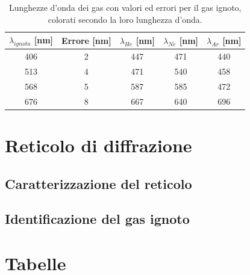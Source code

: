 \documentclass[letterpaper,12pt]{article}
\begin{document}
\begin{table}[h!]
    \centering
    \begin{tabular}{|c|c|c|c|c|}
    \hline
    \textbf{$\lambda_{ignota}$} [nm] & \textbf{Errore} [nm] & \textbf{$\lambda_{He}$} [nm] & \textbf{$\lambda_{Ne}$} [nm] & \textbf{$\lambda_{Ar}$} [nm]\\
    \hline
    \cellcolor{wavelength_406} 406 & 2 & \cellcolor{wavelength_447} 447 & \cellcolor{wavelength_471} 471 & \cellcolor{wavelength_440} 440 \\
    \hline
    \cellcolor{wavelength_513} 513 & 4 & \cellcolor{wavelength_471} 471 & \cellcolor{wavelength_540} 540 & \cellcolor{wavelength_458} 458 \\
    \hline
    \cellcolor{wavelength_568} 568 & 5 & \cellcolor{wavelength_587} 587 & \cellcolor{wavelength_585} 585 & \cellcolor{wavelength_472} 472 \\
    \hline
    \cellcolor{wavelength_676} 676 & 8 & \cellcolor{wavelength_667} 667 & \cellcolor{wavelength_640} 640 & \cellcolor{wavelength_696} 696 \\
    \hline
    \end{tabular}
    \caption{Lunghezze d'onda dei gas con valori ed errori per il gas ignoto, colorati secondo la loro lunghezza d'onda.}
    \label{tab:prisma_ignoto}
\end{table}


\section{Reticolo di diffrazione}

\subsection{Caratterizzazione del reticolo}

\subsection{Identificazione del gas ignoto}

\newpage
\section{Tabelle}
\end{document}

